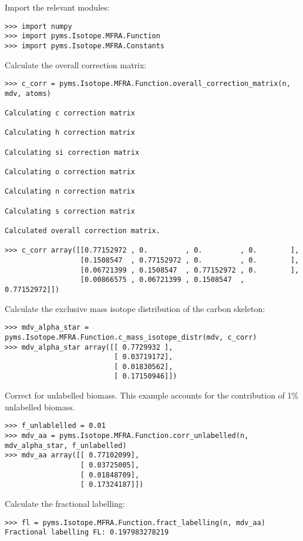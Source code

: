 Import the relevant modules:

\begin{verbatim}
>>> import numpy 
>>> import pyms.Isotope.MFRA.Function 
>>> import pyms.Isotope.MFRA.Constants
\end{verbatim}

Calculate the overall correction matrix:

\begin{verbatim}
>>> c_corr = pyms.Isotope.MFRA.Function.overall_correction_matrix(n, mdv, atoms)

Calculating c correction matrix 

Calculating h correction matrix 

Calculating si correction matrix 

Calculating o correction matrix 

Calculating n correction matrix 

Calculating s correction matrix 

Calculated overall correction matrix.

>>> c_corr array([[0.77152972 , 0.         , 0.         , 0.        ],
                  [0.1508547  , 0.77152972 , 0.         , 0.        ],        
                  [0.06721399 , 0.1508547  , 0.77152972 , 0.        ],
                  [0.00866575 , 0.06721399 , 0.1508547  , 0.77152972]])
\end{verbatim}

Calculate the exclusive mass isotope distribution of the carbon skeleton:

\begin{verbatim}
>>> mdv_alpha_star = pyms.Isotope.MFRA.Function.c_mass_isotope_distr(mdv, c_corr) 
>>> mdv_alpha_star array([[ 0.7729932 ],        
                          [ 0.03719172],        
                          [ 0.01830562],        
                          [ 0.17150946]])
\end{verbatim}

Correct for unlabelled biomass. This example accounts for the contribution
of 1\% unlabelled biomass.

\begin{verbatim}
>>> f_unlablelled = 0.01 
>>> mdv_aa = pyms.Isotope.MFRA.Function.corr_unlabelled(n, mdv_alpha_star, f_unlabelled) 
>>> mdv_aa array([[ 0.77102099],        
                  [ 0.03725005],        
                  [ 0.01848709],        
                  [ 0.17324187]])
\end{verbatim}

Calculate the fractional labelling:

\begin{verbatim}
>>> fl = pyms.Isotope.MFRA.Function.fract_labelling(n, mdv_aa) 
Fractional labelling FL: 0.197983278219
\end{verbatim}


